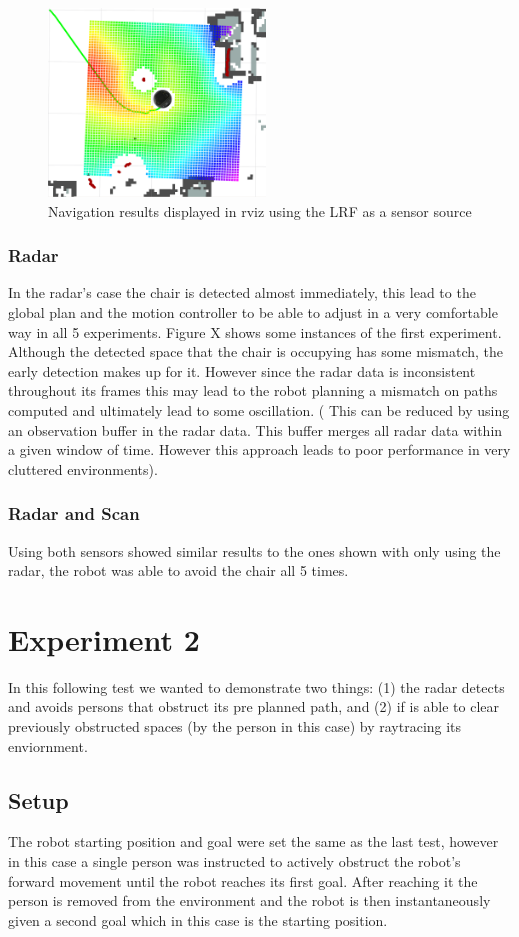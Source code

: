 \begin{figure}[h]
\begin{minipage}[b]{.32\linewidth}
        \includegraphics[height=5cm,width=\linewidth]{imgs/chapter5/scan3.png}
    \end{minipage}
    \caption{Navigation results displayed in rviz using the \ac{LRF} as a sensor source}
    \label{fig:scan_results_chair}
\end{figure}
\subsubsection{Radar}
In the radar's case the chair is detected almost immediately, this lead to the global plan and the motion controller to be able to adjust in a very comfortable way in all 5 experiments. Figure X shows some instances of the first experiment. Although the detected space that the chair is occupying has some mismatch, the early detection makes up for it. However since the radar data is inconsistent throughout its frames this may lead to the robot planning a mismatch on paths computed and ultimately lead to some oscillation. ( This can be reduced by using an observation buffer in the radar data. This buffer merges all radar data within a given window of time. However this approach leads to poor performance in very cluttered environments).
\subsubsection{Radar and Scan}
Using both sensors showed similar results to the ones shown with only using the radar, the robot was able to avoid the chair all 5 times. 
\section {Experiment 2}
In this following test we wanted to demonstrate two things: (1) the radar detects and avoids persons that obstruct its pre planned path, and (2) if is able to clear previously obstructed spaces (by the person in this case) by raytracing its enviornment. 
\subsection{Setup}
The robot starting position and goal were set the same as the last test, however in this case a single person was instructed to actively obstruct the robot's forward movement until the robot reaches its first goal. After reaching it the person is removed from the environment  and the robot is then instantaneously given a second goal which in this case is the starting position.
